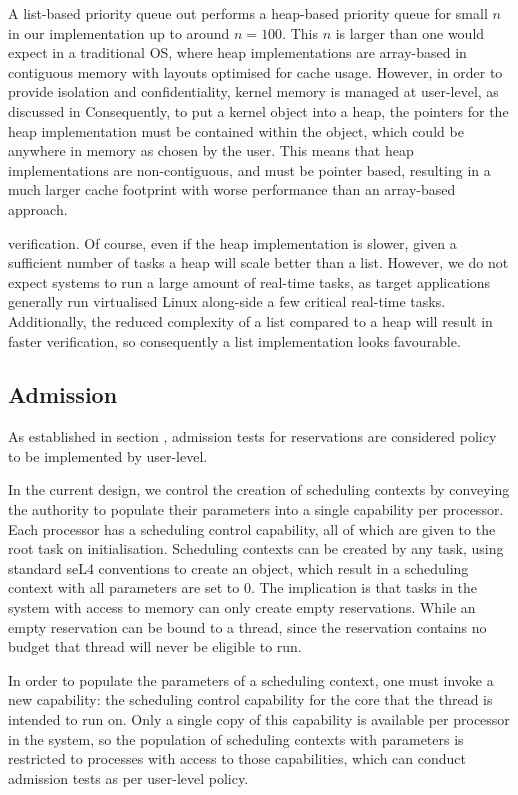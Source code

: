 A list-based priority queue out performs a heap-based priority queue for small $n$ in our implementation up to around $n = 100$.
This $n$ is larger than one would expect in a traditional \gls{OS}, where heap implementations are array-based in contiguous memory with layouts optimised for cache usage.
However, in order to provide isolation and confidentiality, \selfour kernel memory is managed at user-level, as discussed in %
Consequently, to put a \selfour kernel object into a heap, the pointers for the heap implementation must be contained within the object, which could be anywhere in memory as chosen by the user.
This means that \selfour heap implementations are non-contiguous, and must be pointer based, resulting in a much larger cache footprint with worse performance than an array-based approach.

verification.
Of course, even if the heap implementation is slower, given a sufficient number of tasks a heap will scale better than a list.
However, we do not expect systems to run a large amount of real-time tasks, as \selfour target applications generally run virtualised Linux along-side a few critical real-time tasks.
Additionally, the reduced complexity of a list compared to a heap will result in faster verification, so consequently a list implementation looks favourable.

\subsection{Admission}

As established in section , admission tests for reservations are considered policy to be implemented by user-level.

In the current design, we control the creation of scheduling contexts by conveying the authority to populate their parameters into a single capability per processor.
Each processor has a scheduling control capability, all of which are given to the root task on initialisation.
Scheduling contexts can be created by any task, using standard seL4 conventions to create an object, which result in a scheduling context with all parameters are set to 0.
The implication is that tasks in the system with access to memory can only create empty reservations.
While an empty reservation can be bound to a thread, since the reservation contains no budget that thread will never be eligible to run.

In order to populate the parameters of a scheduling context, one must invoke a new capability: the scheduling control capability for the core that the thread is intended to run on.
Only a single copy of this capability is available per processor in the system, so the population of scheduling contexts with parameters is restricted to processes with access to those capabilities, which can conduct admission tests as per user-level policy.

